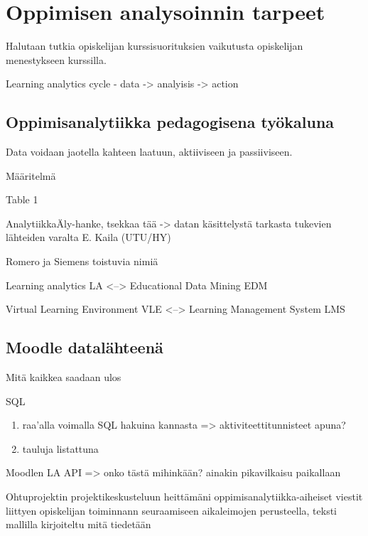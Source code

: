 \color{red}
\chapter{Oppimisen analysoinnin tarpeet\label{oppimisenanalysoinnintarpeet}}

Halutaan tutkia opiskelijan kurssisuorituksien vaikutusta opiskelijan menestykseen kurssilla.

Learning analytics cycle - data -> analyisis -> action \citep{hasanPredictingStudentPerformance2020}

\section{Oppimisanalytiikka pedagogisena työkaluna}

Data voidaan jaotella kahteen laatuun, aktiiviseen ja passiiviseen. \cite{maddenDigitalFootprints2007} \cite{mikkolaMitaOppimisanalytiikka2019}

Määritelmä \cite{siemensLearningAnalyticsEmergence2013}

Table 1 \cite{longPenetratingFogAnalytics}

AnalytiikkaÄly-hanke, tsekkaa tää -> datan käsittelystä tarkasta tukevien lähteiden varalta \cite{kokkonenEffectsDataCleaning}
E. Kaila (UTU/HY)

Romero ja Siemens toistuvia nimiä

Learning analytics LA <--> Educational Data Mining EDM

Virtual Learning Environment VLE <--> Learning Management System LMS

\section{Moodle datalähteenä}

Mitä kaikkea saadaan ulos

SQL
\begin{enumerate}
    \item raa'alla voimalla SQL hakuina kannasta => aktiviteettitunnisteet apuna?
    \item tauluja listattuna \citep{romeroSurveyPreProcessingEducational2014}
\end{enumerate}


Moodlen LA API => onko tästä mihinkään? ainakin pikavilkaisu paikallaan

Ohtuprojektin projektikeskusteluun heittämäni oppimisanalytiikka-aiheiset viestit liittyen opiskelijan toiminnann seuraamiseen aikaleimojen perusteella, teksti mallilla kirjoiteltu mitä tiedetään

